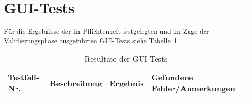 \section{GUI-Tests}

Für die Ergebnisse der im Pflichtenheft festgelegten und im Zuge der Validierungsphase ausgeführten GUI-Tests siehe Tabelle~\ref{typesystemdef}.

\begin{landscape}

\begin{longtable}{lp{8cm}lp{10cm}}
\label{typesystemdef} \\
\caption{Resultate der GUI-Tests} \\
\toprule
\textbf{Testfall-Nr.} & \textbf{Beschreibung} & \textbf{Ergebnis} & \textbf{Gefundene Fehler/Anmerkungen} \\
\midrule
\midrule

\endhead

\endfoot


\end{longtable}
\end{landscape}
